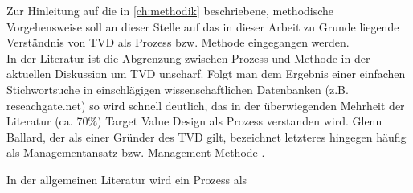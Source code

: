 %
%
%
%
%
%

Zur Hinleitung auf die in \cref{ch:methodik} beschriebene, methodische Vorgehensweise soll an dieser Stelle auf das in dieser Arbeit zu Grunde liegende Verständnis von \ac{TVD} als Prozess bzw. Methode eingegangen werden.\\
In der Literatur ist die Abgrenzung zwischen Prozess und Methode in der aktuellen Diskussion um TVD unscharf. Folgt man dem Ergebnis einer einfachen Stichwortsuche in einschlägigen wissenschaftlichen Datenbanken (z.B. reseachgate.net) so wird schnell deutlich, das in der überwiegenden Mehrheit der Literatur (ca. 70\%) Target Value Design als Prozess verstanden wird.
Glenn Ballard, der als einer Gründer des \ac{TVD} gilt, bezeichnet letzteres hingegen häufig als Managementansatz bzw. Management-Methode \autocite[]{}.

In der allgemeinen Literatur wird ein Prozess als 